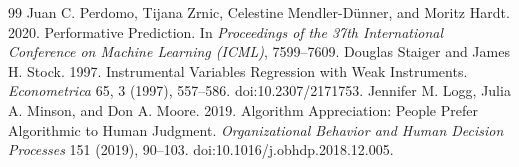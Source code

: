 \begin{thebibliography}{99}
 Juan C. Perdomo, Tijana Zrnic, Celestine Mendler-Dünner, and Moritz Hardt. 2020. Performative Prediction. In \emph{Proceedings of the 37th International Conference on Machine Learning (ICML)}, 7599--7609.
 Douglas Staiger and James H. Stock. 1997. Instrumental Variables Regression with Weak Instruments. \emph{Econometrica} 65, 3 (1997), 557--586. doi:10.2307/2171753.
 Jennifer M. Logg, Julia A. Minson, and Don A. Moore. 2019. Algorithm Appreciation: People Prefer Algorithmic to Human Judgment. \emph{Organizational Behavior and Human Decision Processes} 151 (2019), 90--103. doi:10.1016/j.obhdp.2018.12.005.
\end{thebibliography}
